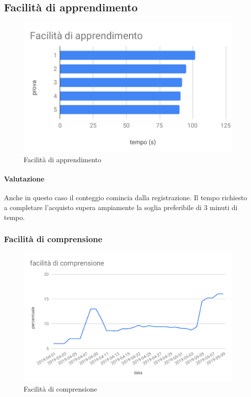 \subsection{Facilità di apprendimento}
\begin{figure}[H]
	\centering
	\includegraphics[scale=0.7]{res/images/RA/facilita-di-apprendimento.pdf}
	\caption{Facilità di apprendimento}
\end{figure}
\paragraph*{Valutazione}
Anche in questo caso il conteggio comincia dalla registrazione. Il tempo richiesto a completare l'acquisto supera ampiamente la soglia preferibile di 3 minuti di tempo. 

\subsubsection{Facilità di comprensione} %
\begin{figure}[H]
	\centering
	\includegraphics[scale=0.6]{res/images/RA/facilita-di-comprensione.pdf}
	\caption{Facilità di comprensione}
\end{figure}
